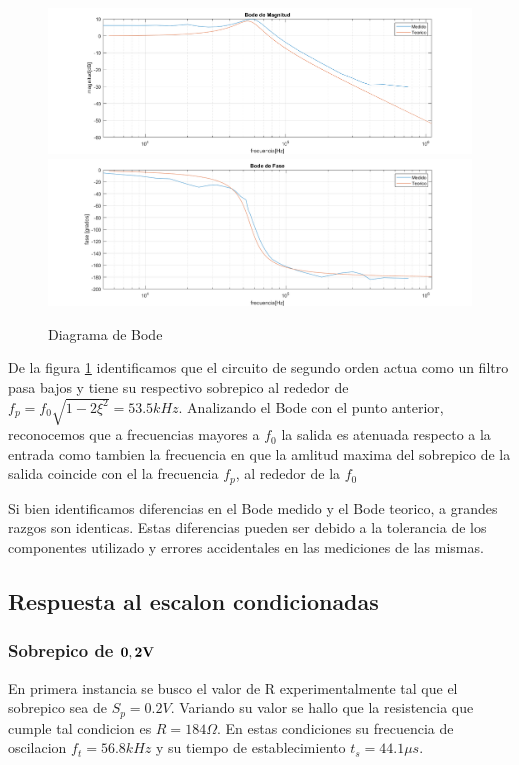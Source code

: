 \begin{figure}[h!]
\centering
\includegraphics[scale=0.25]{2cmag.png}
\includegraphics[scale=0.25]{2cfase.png}
\caption{Diagrama de Bode}
\label{fig:LRC2c}
\end{figure}

\pagebreak

De la figura \ref{fig:LRC2c} identificamos que el circuito de segundo orden actua como un filtro pasa bajos y tiene su respectivo sobrepico al rededor de $f_p=f_0\sqrt{1-2\xi^2}=53.5kHz$. Analizando el Bode con el punto anterior, reconocemos que a frecuencias mayores a $f_0$ la salida es atenuada respecto a la entrada como tambien la frecuencia en que la amlitud maxima del sobrepico de la salida coincide con el la frecuencia $f_p$, al rededor de la $f_0$

Si bien identificamos diferencias en el Bode medido y el Bode teorico, a grandes razgos son identicas. Estas diferencias pueden ser debido a la tolerancia de los componentes utilizado y errores accidentales en las mediciones de las mismas. 

\subsection{Respuesta al escalon condicionadas}

\subsubsection{Sobrepico de $\bold{0,2V}$} \label{dSobrepico de 0.2v}

En primera instancia se busco el valor de R experimentalmente tal que el sobrepico sea de $S_p=0.2V$. Variando su valor se hallo que la resistencia que cumple tal condicion es $R=184\Omega$. En estas condiciones su frecuencia de oscilacion $f_t=56.8kHz$ y su tiempo de establecimiento $t_s = 44.1{\mu}s$. 

